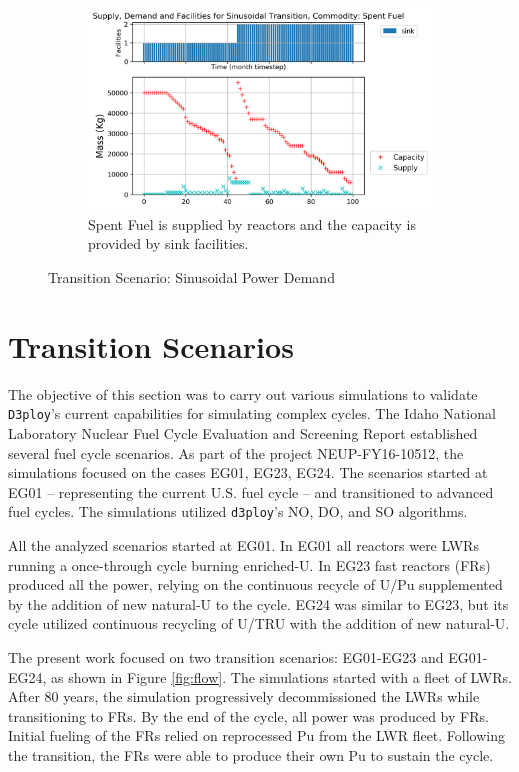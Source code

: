\documentclass[11pt,letterpaper]{article}
\begin{document}
\begin{figure}[!htbp]
    \begin{subfigure}[t]{0.65\textwidth}
        \centering
        \includegraphics[width=\linewidth]{figures/sinetransition-spentfuel.png} 
        \caption{Spent Fuel is supplied by reactors and the capacity is provided by sink facilities.}
        \label{fig:sinetransition-spentfuel}
    \end{subfigure}
    \caption{Transition Scenario: Sinusoidal Power Demand}
\end{figure}

\pagebreak
\section{Transition Scenarios}

The objective of this section was to carry out various simulations to validate 
\texttt{D3ploy}'s current capabilities for simulating complex cycles.
The Idaho National Laboratory Nuclear Fuel Cycle Evaluation and Screening Report \cite{wigeland_nuclear_2014} established several fuel cycle scenarios.
As part of the project NEUP-FY16-10512, the simulations focused on the cases EG01, EG23, EG24. The scenarios started at EG01 -- representing the current U.S. fuel cycle -- and transitioned to advanced fuel cycles.
The simulations utilized \texttt{d3ploy}'s NO, DO, and SO algorithms.

All the analyzed scenarios started at EG01. In EG01 all reactors were LWRs running a  once-through cycle burning enriched-U.
In EG23 fast reactors (FRs) produced all the power, relying on the continuous recycle of U/Pu supplemented by the addition of new natural-U to the cycle.
EG24 was similar to EG23, but its cycle utilized continuous recycling of U/TRU with the addition of new natural-U.

The present work focused on two transition scenarios: EG01-EG23 and EG01-EG24,  as shown in Figure \ref{fig:flow}. The simulations started with a fleet of LWRs. After 80 years, the simulation progressively decommissioned the LWRs while transitioning to FRs. By the end of the cycle, all power was produced by FRs. Initial fueling of the FRs relied on  reprocessed Pu from the LWR fleet. Following the transition, the FRs were able to produce their own Pu to sustain the cycle.
\end{document}
